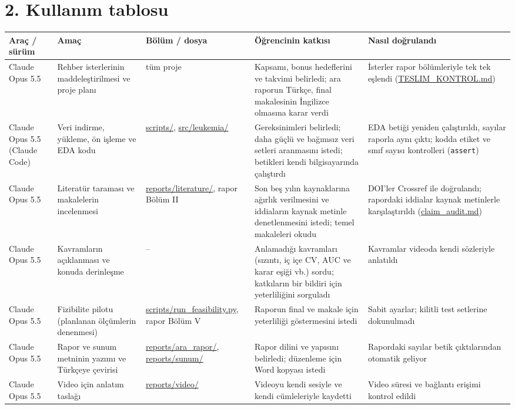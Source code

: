 \documentclass[11pt,a4paper]{article}
\begin{document}
\section*{2. Kullanım tablosu}
{\small
\begin{xltabular}{\textwidth}{@{}>{\raggedright\arraybackslash}p{2.2cm} Y >{\raggedright\arraybackslash}p{2.9cm} Y Y@{}}
\toprule
Araç / sürüm & Amaç & Bölüm / dosya & Öğrencinin katkısı & Nasıl doğrulandı \\
\midrule
\endhead
Claude Opus 5.5 & Rehber isterlerinin maddeleştirilmesi ve proje planı & tüm proje &
Kapsamı, bonus hedeflerini ve takvimi belirledi; ara raporun Türkçe, final makalesinin İngilizce olmasına karar verdi &
İsterler rapor bölümleriyle tek tek eşlendi (\url{TESLIM_KONTROL.md}) \\
Claude Opus 5.5 (Claude Code) & Veri indirme, yükleme, ön işleme ve EDA kodu & \url{scripts/}, \url{src/leukemia/} &
Gereksinimleri belirledi; daha güçlü ve bağımsız veri setleri aranmasını istedi; betikleri kendi bilgisayarında çalıştırdı &
EDA betiği yeniden çalıştırıldı, sayılar raporla aynı çıktı; kodda etiket ve sınıf sayısı kontrolleri (\texttt{assert}) \\
Claude Opus 5.5 & Literatür taraması ve makalelerin incelenmesi & \url{reports/literature/}, rapor Bölüm II &
Son beş yılın kaynaklarına ağırlık verilmesini ve iddiaların kaynak metinle denetlenmesini istedi; temel makaleleri okudu &
DOI'ler Crossref ile doğrulandı; rapordaki iddialar kaynak metinlerle karşılaştırıldı (\url{claim_audit.md}) \\
Claude Opus 5.5 & Kavramların açıklanması ve konuda derinleşme & -- &
Anlamadığı kavramları (sızıntı, iç içe CV, AUC ve karar eşiği vb.) sordu; katkıların bir bildiri için yeterliliğini sorguladı &
Kavramlar videoda kendi sözleriyle anlatıldı \\
Claude Opus 5.5 & Fizibilite pilotu (planlanan ölçümlerin denenmesi) & \url{scripts/run_feasibility.py}, rapor Bölüm V &
Raporun final ve makale için yeterliliği göstermesini istedi &
Sabit ayarlar; kilitli test setlerine dokunulmadı \\
Claude Opus 5.5 & Rapor ve sunum metninin yazımı ve Türkçeye çevirisi & \url{reports/ara_rapor/}, \url{reports/sunum/} &
Rapor dilini ve yapısını belirledi; düzenleme için Word kopyası istedi &
Rapordaki sayılar betik çıktılarından otomatik geliyor \\
Claude Opus 5.5 & Video için anlatım taslağı & \url{reports/video/} &
Videoyu kendi sesiyle ve kendi cümleleriyle kaydetti & Video süresi ve bağlantı erişimi kontrol edildi \\
\bottomrule
\end{xltabular}}
\end{document}
